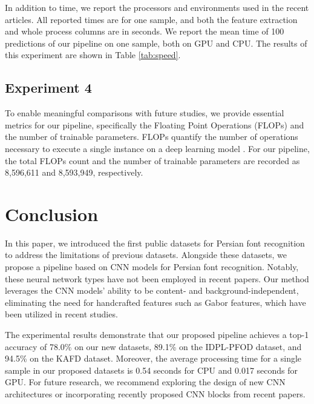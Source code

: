 \documentclass[conference]{IEEEtran}
\begin{document}
In addition to time, we report the processors and environments used in the recent articles. All reported times are for one sample, and both the feature extraction and whole process columns are in seconds. We report the mean time of 100 predictions of our pipeline on one sample, both on GPU and CPU. The results of this experiment are shown in Table \ref{tab:speed}. \subsection{Experiment 4}
To enable meaningful comparisons with future studies, we provide essential metrics for our pipeline, specifically the Floating Point Operations (FLOPs) and the number of trainable parameters. FLOPs quantify the number of operations necessary to execute a single instance on a deep learning model \cite{app12125902}.
For our pipeline, the total FLOPs count and the number of trainable parameters are recorded as 8,596,611 and 8,593,949, respectively.  \section{Conclusion}\label{sec5}
In this paper, we introduced the first public datasets for Persian font recognition to address the limitations of previous datasets. Alongside these datasets, we propose a pipeline based on CNN models for Persian font recognition. Notably, these neural network types have not been employed in recent papers.
Our method leverages the CNN models' ability to be content- and background-independent, eliminating the need for handcrafted features such as Gabor features, which have been utilized in recent studies.

The experimental results demonstrate that our proposed pipeline achieves a top-1 accuracy of 78.0\% on our new datasets, 89.1\% on the IDPL-PFOD dataset, and 94.5\% on the KAFD dataset. Moreover, the average processing time for a single sample in our proposed datasets is 0.54 seconds for CPU and 0.017 seconds for GPU. For future research, we recommend exploring the design of new CNN architectures or incorporating recently proposed CNN blocks from recent papers. 



\end{document}
